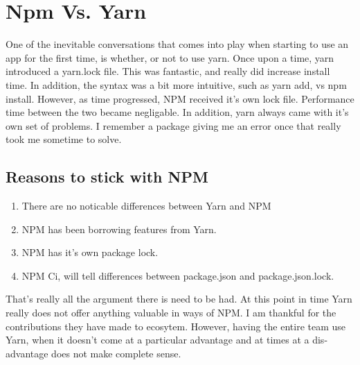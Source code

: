 \maketitle{}
\section{ Npm Vs. Yarn }

One of the inevitable conversations that comes into play when starting to use
an app for the first time, is whether, or not to use yarn. Once upon a time,
yarn introduced a yarn.lock file. This was fantastic, and really did increase
install time. In addition, the syntax was a bit more intuitive, such as yarn
add, vs npm install. However, as time progressed, NPM received it's own lock
file. Performance time between the two became negligable. In addition, yarn
always came with it's own set of problems. I remember a package giving me an
error once that really took me sometime to solve.

\subsection{ Reasons to stick with NPM }
\begin{enumerate}
  \item There are no noticable differences between Yarn and NPM
  \item NPM has been borrowing features from Yarn.
  \item NPM has it's own package lock.
  \item NPM Ci, will tell differences between package.json and package.json.lock.
\end{enumerate}

That's really all the argument there is need to be had. At this point in time
Yarn really does not offer anything valuable in ways of NPM. I am thankful for
the contributions they have made to ecosytem. However, having the entire team
use Yarn, when it doesn't come at a particular advantage and at times at a
dis-advantage does not make complete sense.
